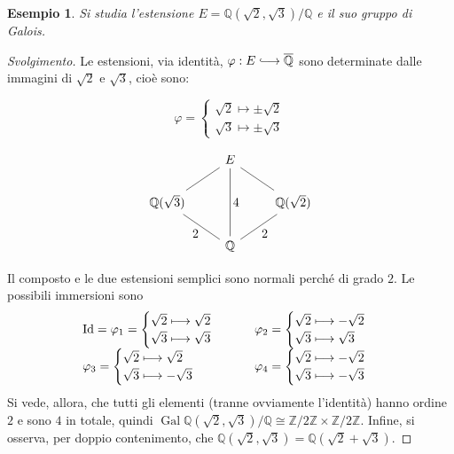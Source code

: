 \documentclass[12pt]{scrartcl}
\theoremstyle{style}
\newtheorem{esempio}{Esempio}[section]
\newenvironment{svolgimento}{\renewcommand\qedsymbol{$\blacksquare$}\begin{proof}[Svolgimento]}{\end{proof}}
\numberwithin{equation}{subsection}
\newcommand{\longhookrightarrow}{\lhook\joinrel\longrightarrow}
\begin{document}
\begin{esempio}
Si studia l'estensione $E = \mathbb{Q}(\sqrt{2} , \sqrt{3} ) / \mathbb{Q}$ e il suo gruppo di Galois.
\end{esempio}
\begin{svolgimento}
	Le estensioni, via identit\`a, $\varphi : E \longhookrightarrow \overline{\mathbb{Q}}$ sono determinate dalle immagini di $\sqrt{2} $ e $\sqrt{3} $, cio\`e sono:
	\begin{center}
\begin{minipage}
	{0.45\columnwidth}
	\[
	\varphi = \begin{cases}
		\sqrt{2} \longmapsto \pm \sqrt{2} \\
		\sqrt{3} \longmapsto \pm \sqrt{3} 
	\end{cases}
	\] 
\end{minipage}	
\hfill
\begin{minipage}
	{0.45\columnwidth}
	\[
	\begin{tikzcd}
	&  E  & \\
		\mathbb{Q}(\sqrt{3} )  & &  \mathbb{Q}(\sqrt{2} )\\
				       & \mathbb{Q} & 
				      \arrow[from=1-2, to=2-1, no head]
				      \arrow[from=1-2, to=2-3, no head]
				      \arrow[from=1-2, to=3-2, no head, "\displaystyle 4"]
				      \arrow[from=3-2, to=2-1, no head, "\displaystyle 2"]
				      \arrow[from=3-2, to=2-3, no head, "\displaystyle 2"']
	\end{tikzcd}
	\] 
\end{minipage}
	\end{center}
	Il composto e le due estensioni semplici sono normali perch\'e di grado $2$.
	Le possibili immersioni sono
	\[
\begin{array}
	{l l}
	\mathrm{Id} = \varphi _1 = \begin{cases}
		\sqrt{2} \longmapsto \sqrt{2} \\
		\sqrt{3} \longmapsto \sqrt{3} 
		\end{cases} \hspace{.5cm}&\varphi _2 = \begin{cases}
		\sqrt{2} \longmapsto - \sqrt{2} \\
		\sqrt{3} \longmapsto  \sqrt{3} 
	\end{cases} 	\\
\varphi _3 = \begin{cases}
		\sqrt{2} \longmapsto \sqrt{2} \\
		\sqrt{3} \longmapsto -\sqrt{3} 
	\end{cases} & \varphi _4 = \begin{cases}
		\sqrt{2} \longmapsto -\sqrt{2} \\
		\sqrt{3} \longmapsto - \sqrt{3} 
	\end{cases}
\end{array}
\] 
Si vede, allora, che tutti gli elementi (tranne ovviamente l'identit\`a) hanno ordine $2$ e sono $4$ in totale, quindi $\operatorname{Gal} \mathbb{Q}(\sqrt{2} , \sqrt{3} ) / \mathbb{Q} \cong \mathbb{Z}/ 2\mathbb{Z} \times \mathbb{Z}/2\mathbb{Z}$.	
Infine, si osserva, per doppio contenimento, che $\mathbb{Q}(\sqrt{2} ,\sqrt{3} ) = \mathbb{Q}(\sqrt{2} +\sqrt{3} )$.
\end{svolgimento}
\end{document}
